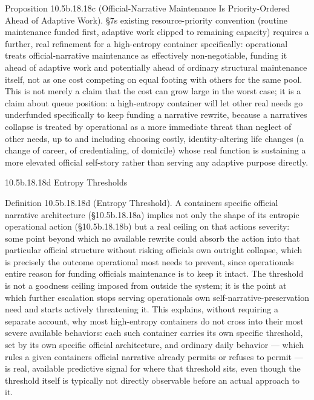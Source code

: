\documentclass[
]{article}
\begin{document}
Proposition 10.5b.18.18c (Official-Narrative Maintenance Is
Priority-Ordered Ahead of Adaptive Work). §7s existing resource-priority
convention (routine maintenance funded first, adaptive work clipped to
remaining capacity) requires a further, real refinement for a
high-entropy container specifically: operational treats
official-narrative maintenance as effectively non-negotiable, funding it
ahead of adaptive work and potentially ahead of ordinary structural
maintenance itself, not as one cost competing on equal footing with
others for the same pool. This is not merely a claim that the cost can
grow large in the worst case; it is a claim about queue position: a
high-entropy container will let other real needs go underfunded
specifically to keep funding a narrative rewrite, because a narratives
collapse is treated by operational as a more immediate threat than
neglect of other needs, up to and including choosing costly,
identity-altering life changes (a change of career, of credentialing, of
domicile) whose real function is sustaining a more elevated official
self-story rather than serving any adaptive purpose directly.

10.5b.18.18d Entropy Thresholds

Definition 10.5b.18.18d (Entropy Threshold). A containers specific
official narrative architecture (§10.5b.18.18a) implies not only the
shape of its entropic operational action (§10.5b.18.18b) but a real
ceiling on that actions severity: some point beyond which no available
rewrite could absorb the action into that particular official structure
without risking officials own outright collapse, which is precisely the
outcome operational most needs to prevent, since operationals entire
reason for funding officials maintenance is to keep it intact. The
threshold is not a goodness ceiling imposed from outside the system; it
is the point at which further escalation stops serving operationals own
self-narrative-preservation need and starts actively threatening it.
This explains, without requiring a separate account, why most
high-entropy containers do not cross into their most severe available
behaviors: each such container carries its own specific threshold, set
by its own specific official architecture, and ordinary daily behavior
--- which rules a given containers official narrative already permits or
refuses to permit --- is real, available predictive signal for where
that threshold sits, even though the threshold itself is typically not
directly observable before an actual approach to it.
\end{document}

